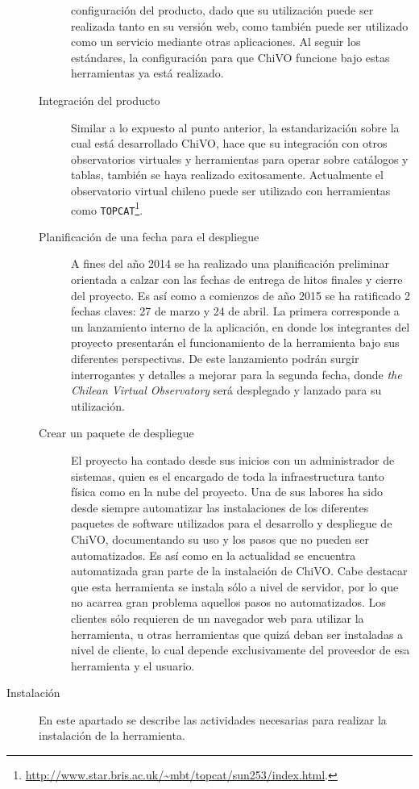 \begin{description}
\begin{description}
configuración del producto, dado que su utilización puede ser realizada tanto en
su versión web, como tambi\'en puede ser utilizado como un servicio mediante
otras aplicaciones. Al seguir los estándares, la configuración para que ChiVO
funcione bajo estas herramientas ya está realizado.
			\item [Integración del producto] Similar a lo expuesto al punto
anterior, la estandarización sobre la cual está desarrollado ChiVO, hace que su
integración con otros observatorios virtuales y herramientas para operar sobre
catálogos y tablas, tambi\'en se haya realizado exitosamente. Actualmente el
observatorio virtual chileno puede ser utilizado con herramientas como
\verb;TOPCAT;\footnote{\url{http://www.star.bris.ac.uk/~mbt/topcat/sun253/index.html}.}.
			\item [Planificación de una fecha para el despliegue] A fines del año
2014 se ha realizado una planificación preliminar orientada a calzar con las
fechas de entrega de hitos finales y cierre del proyecto. Es así como a
comienzos de año 2015 se ha ratificado 2 fechas claves: 27 de marzo y 24 de
abril. La primera corresponde a un lanzamiento interno de la aplicación, en
donde los integrantes del proyecto presentarán el funcionamiento de la
herramienta bajo sus diferentes perspectivas. De este lanzamiento podrán surgir
interrogantes y detalles a mejorar para la segunda fecha, donde \emph{the
Chilean Virtual Observatory} será desplegado y lanzado para su utilización. 
			\item [Crear un paquete de despliegue] El proyecto ha contado desde sus
inicios con un administrador de sistemas, quien es el encargado de toda la
infraestructura tanto física como en la nube del proyecto. Una de sus labores ha
sido desde siempre automatizar las instalaciones de los diferentes paquetes de
software utilizados para el desarrollo y despliegue de ChiVO, documentando su
uso y los pasos que no pueden ser automatizados. Es así como en la actualidad se
encuentra automatizada gran parte de la instalación de ChiVO. Cabe destacar que
esta herramienta se instala sólo a nivel de servidor, por lo que no acarrea gran
problema aquellos pasos no automatizados. Los clientes sólo requieren de un
navegador web para utilizar la herramienta, u otras herramientas que quizá deban
ser instaladas a nivel de cliente, lo cual depende exclusivamente del proveedor
de esa herramienta y el usuario.
		\end{description}
	\item [Instalación] En este apartado se describe las actividades necesarias para realizar la instalación de la herramienta.

\end{description}

